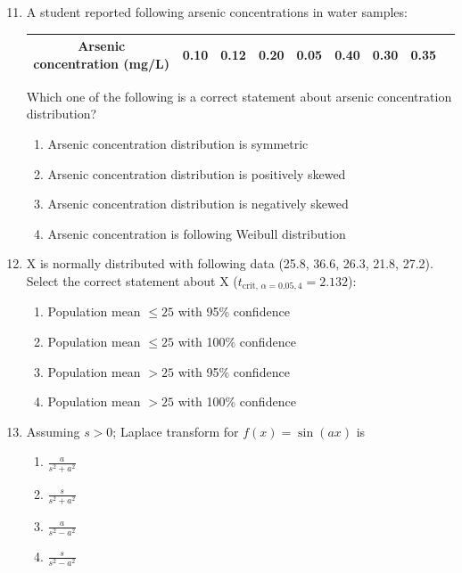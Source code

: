 \documentclass[12pt,a4paper]{article}
\begin{document}
\begin{enumerate}
   \setcounter{enumi}{10}
   \item A student reported following arsenic concentrations in water samples:

         \begin{table}
            \begin{center}
               \begin{tabular}{|c|c|c|c|c|c|c|c|c|}
                  \hline
                  Arsenic concentration (mg/L) & 0.10 & 0.12 & 0.20 & 0.05 & 0.40 & 0.30 & 0.35 \\
                  \hline
               \end{tabular}
            \end{center}
            \label{tab:q11}
         \end{table}

         Which one of the following is a correct statement about arsenic concentration distribution?
         \begin{enumerate}
            \item Arsenic concentration distribution is symmetric
            \item Arsenic concentration distribution is positively skewed
            \item Arsenic concentration distribution is negatively skewed
            \item Arsenic concentration is following Weibull distribution
         \end{enumerate}

   \item X is normally distributed with following data (25.8, 36.6, 26.3, 21.8, 27.2). Select the correct statement about X ($t_{\text{crit},\,\alpha=0.05,4}=2.132$):

         \begin{enumerate}
            \item Population mean $\leq 25$ with 95\% confidence
            \item Population mean $\leq 25$ with 100\% confidence
            \item Population mean $> 25$ with 95\% confidence
            \item Population mean $> 25$ with 100\% confidence
         \end{enumerate}

   \item Assuming $s > 0$; Laplace transform for $f(x) = \sin(ax)$ is
         \begin{enumerate}
            \item $\frac{a}{s^2 + a^2}$
            \item $\frac{s}{s^2 + a^2}$
            \item $\frac{a}{s^2 - a^2}$
            \item $\frac{s}{s^2 - a^2}$
         \end{enumerate}


\end{enumerate}
\end{document}
